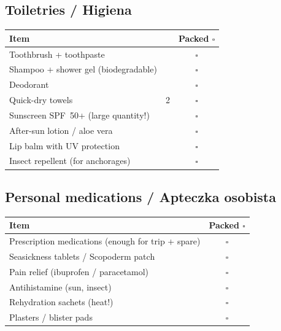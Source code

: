 \documentclass[a4paper,11pt]{article}
\begin{document}
\vspace{0.3cm}

\subsection*{Toiletries / Higiena}
\begin{tabularx}{\linewidth}{|X|c|c|}
\hline
\textbf{Item} & & \textbf{Packed \(\square\)} \\
\hline
Toothbrush + toothpaste & & \(\square\) \\[4pt]\hline
Shampoo + shower gel (biodegradable) & & \(\square\) \\[4pt]\hline
Deodorant & & \(\square\) \\[4pt]\hline
Quick-dry towels & 2 & \(\square\) \\[4pt]\hline
Sunscreen SPF~50+ (large quantity!) & & \(\square\) \\[4pt]\hline
After-sun lotion / aloe vera & & \(\square\) \\[4pt]\hline
Lip balm with UV protection & & \(\square\) \\[4pt]\hline
Insect repellent (for anchorages) & & \(\square\) \\[4pt]\hline
\end{tabularx}

\vspace{0.3cm}

\subsection*{Personal medications / Apteczka osobista}
\begin{tabularx}{\linewidth}{|X|c|}
\hline
\textbf{Item} & \textbf{Packed \(\square\)} \\
\hline
Prescription medications (enough for trip + spare) & \(\square\) \\[4pt]\hline
Seasickness tablets / Scopoderm patch & \(\square\) \\[4pt]\hline
Pain relief (ibuprofen / paracetamol) & \(\square\) \\[4pt]\hline
Antihistamine (sun, insect) & \(\square\) \\[4pt]\hline
Rehydration sachets (heat!) & \(\square\) \\[4pt]\hline
Plasters / blister pads & \(\square\) \\[4pt]\hline
\end{tabularx}

\vspace{0.3cm}
\end{document}
